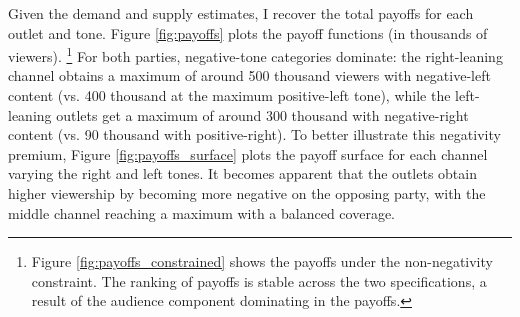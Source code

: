 \documentclass[12pt]{article}
\begin{document}
Given the demand and supply estimates, I recover the total payoffs for each outlet and tone.  Figure \ref{fig:payoffs} plots the payoff functions (in thousands of viewers). \footnote{Figure \ref{fig:payoffs_constrained} shows the payoffs under the non-negativity constraint. The ranking of payoffs is stable across the two specifications, a result of the audience component dominating in the payoffs.} For both parties, negative-tone categories dominate: the right-leaning channel obtains a maximum of  around 500 thousand viewers with negative-left content (vs. 400 thousand at the maximum positive-left tone), while the left-leaning outlets get a maximum of around 300 thousand with negative-right content (vs. 90 thousand with positive-right). To better illustrate this negativity premium, Figure \ref{fig:payoffs_surface} plots the payoff surface for each channel varying the right and left tones. It becomes apparent that the outlets obtain higher viewership by becoming more negative on the opposing party, with the middle channel reaching a maximum with a balanced coverage. 










\end{document}
